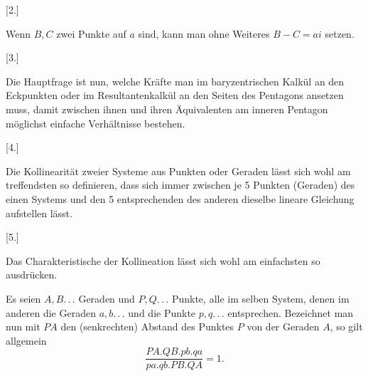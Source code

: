 \begin{center}
[2.]
\end{center}

Wenn $B, C$ zwei Punkte auf $a$ sind, kann man ohne Weiteres $B - C = ai$ setzen.

\begin{center}
[3.]
\end{center}

Die Hauptfrage ist nun, welche Kräfte man im baryzentrischen Kalkül an den Eckpunkten oder im Resultantenkalkül an den Seiten des Pentagons ansetzen muss, damit zwischen ihnen und ihren Äquivalenten am inneren Pentagon möglichst einfache Verhältnisse bestehen.

\begin{center}
[4.]
\end{center}

Die Kollinearität zweier Systeme aus Punkten oder Geraden lässt sich wohl am treffendsten so definieren, dass sich immer zwischen je 5 Punkten (Geraden) des einen Systems und den 5 entsprechenden des anderen dieselbe lineare Gleichung aufstellen lässt.

\begin{center}
[5.]
\end{center}

Das Charakteristische der Kollineation lässt sich wohl am einfachsten so ausdrücken.

Es seien $A, B.\,.\,.$ Geraden und $P,Q.\,.\,.$ Punkte, alle im selben System, denen im anderen die Geraden $a,b.\,.\,.$ und die Punkte $p,q.\,.\,.$ entsprechen. Bezeichnet man nun mit $PA$ den (senkrechten) Abstand des Punktes $P$ von der Geraden $A$, so gilt allgemein
\[
\frac{PA.QB.pb.qa}{pa.qb.PB.QA} = 1.
\]
